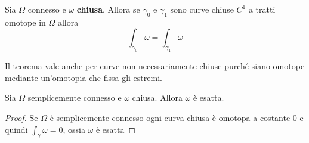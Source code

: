 \begin{theorem}\label{thm:2_forme}
    Sia \(\Omega\) connesso e \(\omega\) \textbf{chiusa}. Allora se
    \(\gamma_{0}\) e \(\gamma_{1}\) sono curve chiuse \(C^{1}\) a tratti omotope
    in \(\Omega\) allora
    \[
        \int_{\gamma_{0}} \omega = \int_{\gamma_{1}} \omega
    \]
\end{theorem}
\begin{remark}
    Il teorema vale anche per curve non necessariamente chiuse purché siano omotope 
    mediante un'omotopia che fissa gli estremi.
\end{remark}

\begin{corollary}
    Sia \(\Omega\) semplicemente connesso e \(\omega\) chiusa. Allora \(\omega\)
    è esatta.
\end{corollary}
\begin{proof}
    Se \(\Omega\) è semplicemente connesso ogni curva chiusa è omotopa a
    costante \(0\) e quindi \(\int_{\gamma} \omega = 0\), ossia \(\omega\) è
    esatta 
\end{proof}


